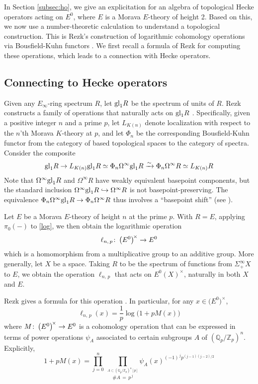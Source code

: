 \documentclass{gtpart}
\theoremstyle{definition}
\theoremstyle{remark}
\def\co{\colon\thinspace}
\newcommand{\mb}[1]{\mathbb{#1}}
\newcommand{\BQ}{{\mb Q}}
\newcommand{\BZ}{{\mb Z}}
\renewcommand{\=}{\approx}
\renewcommand{\-}{\sim}
\newcommand{\gl}{{\rm gl}}
\numberwithin{equation}{section}
\begin{document}
In Section \ref{subsec:ho}, we give an explicitation for an algebra of 
topological Hecke operators acting on $E^0$, where $E$ is a Morava $E$-theory of 
height 2.  Based on this, we now use a number-theoretic calculation to 
understand a topological construction.  This is Rezk's construction of 
logarithmic cohomology operations via Bousfield-Kuhn functors \cite{log}.  We 
first recall a formula of Rezk for computing these operations, which leads to a 
connection with Hecke operators.  



\subsection{Connecting to Hecke operators}

Given any $E_\infty$-ring spectrum $R$, let $\gl_1 R$ be the spectrum of units 
of $R$.  Rezk constructs a family of operations that naturally acts on $\gl_1 R$ 
\cite[Definition 3.6]{log}.  Specifically, given a positive integer $n$ and a 
prime $p$, let $L_{K(n)}$ denote localization with respect to the $n$'th Morava 
$K$-theory at $p$, and let $\Phi_n$ be the corresponding Bousfield-Kuhn functor 
from the category of based topological spaces to the category of spectra.  
Consider the composite 
\begin{equation}
 \label{log}
 \gl_1 R \to L_{K(n)} \gl_1 R \simeq \Phi_n \Omega^\infty \gl_1 R 
 \xrightarrow{\sim} \Phi_n \Omega^\infty R \simeq L_{K(n)} R 
\end{equation}
Note that $\Omega^\infty \gl_1 R$ and $\Omega^\infty R$ have weakly equivalent 
basepoint components, but the standard inclusion 
$\Omega^\infty \gl_1 R \hookrightarrow \Omega^\infty R$ is not 
basepoint-preserving.  The equivalence 
$\Phi_n \Omega^\infty \gl_1 R \to \Phi_n \Omega^\infty R$ thus involves a 
``basepoint shift'' (see \cite[3.4]{log}).  

Let $E$ be a Morava $E$-theory of height $n$ at the prime $p$.  With $R = E$, 
applying $\pi_0(-)$ to \eqref{log}, we then obtain the logarithmic operation 
\[
 \ell_{n,\,p} \co \big( E^0 \big)^{\!\times} \to E^0 
\]
which is a homomorphism from a multiplicative group to an additive group.  More 
generally, let $X$ be a space.  Taking $R$ to be the spectrum of functions from 
$\Sigma^\infty_+ X$ to $E$, we obtain the operation $\ell_{n,\,p}$ that acts on 
$E^0(X)^\times$, naturally in both $X$ and $E$.  

Rezk gives a formula for this operation \cite[Theorem 1.11]{log}.  In 
particular, for any $x \in \big( E^0 \big)^{\!\times}$, 
\begin{equation}
 \label{M}
 \ell_{n,\,p}(x) = \frac{1}{p} \log\big(1 + p M(x)\big) 
\end{equation}
where $M \co \big( E^0 \big)^{\!\times} \to E^0$ is a cohomology operation that 
can be expressed in terms of power operations $\psi_A$ associated to certain 
subgroups $A$ of $(\BQ_p/\BZ_p)^n$.  Explicitly, 
\[
 1 + p M(x) = \prod_{j=0}^n ~ \prod_{\stackrel{\scriptstyle A \subset 
 (\BQ_p/\BZ_p)^n [p]}{\#A \, = \, p^{\,j}}} 
 \psi_A(x)^{(-1)^{\,j} p^{(j-1)(j-2)/2}} 
\]
\end{document}

